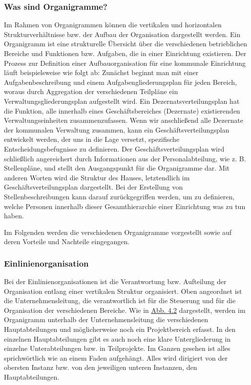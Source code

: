\documentclass[
  letterpaper,
]{book}
\begin{document}
\subsubsection{Was sind Organigramme?}\label{was-sind-organigramme}

Im Rahmen von Organigrammen können die vertikalen und horizontalen
Strukturverhältnisse bzw. der Aufbau der Organisation dargestellt
werden. Ein Organigramm ist eine strukturelle Übersicht über die
verschiedenen betrieblichen Bereiche und Funktionen bzw. Aufgaben, die
in einer Einrichtung existieren. Der Prozess zur Definition einer
Aufbauorganisation für eine kommunale Einrichtung läuft beispielsweise
wie folgt ab: Zunächst beginnt man mit einer Aufgabenbeschreibung und
einem Aufgabengliederungsplan für jeden Bereich, woraus durch
Aggregation der verschiedenen Teilpläne ein Verwaltungsgliederungsplan
aufgestellt wird. Ein Dezernatsverteilungsplan hat die Funktion, alle
innerhalb eines Geschäftsbereiches (Dezernate) existierenden
Verwaltungseinheiten zusammenzufassen. Wenn wir anschließend alle
Dezernate der kommunalen Verwaltung zusammen, kann ein
Geschäftsverteilungsplan entwickelt werden, der uns in die Lage
versetzt, spezifische Entscheidungsbefugnisse zu definieren. Der
Geschäftsverteilungsplan wird schließlich angereichert durch
Informationen aus der Personalabteilung, wie z. B. Stellenpläne, und
stellt den Ausgangspunkt für die Organigramme dar. Mit anderen Worten
wird die Struktur des Hauses, letztendlich im Geschäftsverteilungsplan
dargestellt. Bei der Erstellung von Stellenbeschreibungen kann darauf
zurückgegriffen werden, um zu definieren, welche Personen innerhalb
dieser Gesamthierarchie einer Einrichtung was zu tun haben.

Im Folgenden werden die verschiedenen Organigramme vorgestellt sowie auf
deren Vorteile und Nachteile eingegangen.

\subsubsection{Einlinienorganisation}\label{einlinienorganisation}

Bei der Einlinienorganisationen ist die Verantwortung bzw. Aufteilung
der Organisation entlang einer vertikalen Struktur organisiert. Oben
angeordnet ist die Unternehmensleitung, die verantwortlich ist für die
Steuerung und für die Organisation der verschiedenen Bereiche. Wie in
\hyperref[figure42]{Abb. 4.2} dargestellt, werden im Organigramm
unterhalb der Unternehmensleitung die verschiedenen Hauptabteilungen und
möglicherweise noch ein Projektbereich erfasst. In den einzelnen
Hauptabteilungen gibt es auch noch eine klare Untergliederung in
einzelne Unterabteilungen bzw. in Teilprojekte. Im Ganzen gesehen ist
alles sprichwörtlich wie an einem Faden aufgehängt. Alles wird dirigiert
von der obersten Instanz bzw. von den jeweiligen unteren Instanzen, den
Hauptabteilungen.
\end{document}
